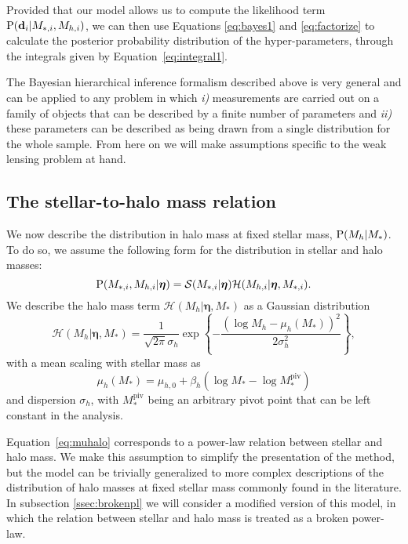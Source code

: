 \documentclass[usenatbib]{mnras}
\def\mstar{M_*}
\def\mstari{M_{*, i}}
\def\mpiv{M_*^{\mathrm{piv}}}
\def\mhalo{M_{h}}
\def\mhaloi{M_{h, i}}
\def\hyperp{\boldsymbol{\eta}}
\def\datai{\mathbf{d}_i}
\def\Eref#1{Equation~\ref{#1}\xspace}
\def\pr{{\rm P}}
\begin{document}
Provided that our model allows us to compute the likelihood term $\pr(\datai | \mstari, \mhaloi)$, we can then use Equations \ref{eq:bayes1} and \ref{eq:factorize} to calculate the posterior probability distribution of the hyper-parameters, through the integrals given by \Eref{eq:integral1}.

The Bayesian hierarchical inference formalism described above is very general and can be applied to any problem in which {\em i)} measurements are carried out on a family of objects that can be described by a finite number of parameters and {\em ii)} these parameters can be described as being drawn from a single distribution for the whole sample.
From here on we will make assumptions specific to the weak lensing problem at hand.

\subsection{The stellar-to-halo mass relation}\label{ssec:shmr}

We now describe the distribution in halo mass at fixed stellar mass, $\pr(\mhalo|\mstar)$. To do so, we assume the following form for the distribution in stellar and halo masses:
\begin{equation}
\pr(\mstari, \mhaloi|\hyperp) = \mathcal{S}(\mstari|\hyperp)\mathcal{H}(\mhaloi|\hyperp, \mstari).
\end{equation}
We describe the halo mass term $\mathcal{H}(\mhalo | \hyperp, \mstar)$ as a Gaussian distribution 
\begin{equation}\label{eq:mhalodist}
\mathcal{H}(\mhalo | \hyperp, \mstar) = \frac{1}{\sqrt{2\pi}\sigma_h}\exp{\left\{-\frac{(\log{\mhalo} - \mu_h(\mstar))^2}{2\sigma_h^2}\right\}},
\end{equation}
with a mean scaling with stellar mass as
\begin{equation}\label{eq:muhalo}
\mu_h(\mstar) = \mu_{h,0} + \beta_h(\log{\mstar} - \log{\mpiv})
\end{equation}
and dispersion $\sigma_h$, with $\mpiv$ being an arbitrary pivot point that can be left constant in the analysis.

\Eref{eq:muhalo} corresponds to a power-law relation between stellar and halo mass.
We make this assumption to simplify the presentation of the method, but the model can be trivially generalized to more complex descriptions of the distribution of halo masses at fixed stellar mass commonly found in the literature.
In subsection \ref{ssec:brokenpl} we will consider a modified version of this model, in which the relation between stellar and halo mass is treated as a broken power-law. 
\end{document}
